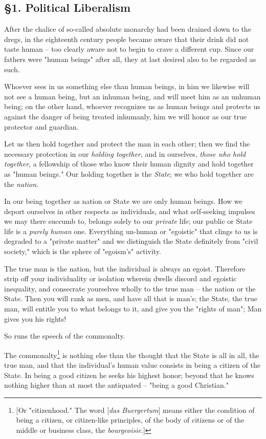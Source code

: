 \subsection[\S{}1. Political Liberalism]{\centering \S{}1. Political Liberalism}

After the chalice of so-called absolute monarchy had been drained down to the 
dregs, in the eighteenth century people became aware that their drink did not 
taste human -- too clearly aware not to begin to crave a different cup. Since 
our fathers were "{}human beings"{} after all, they at last desired also to be 
regarded as such.

Whoever sees in us something else than human beings, in him we likewise will 
not see a human being, but an inhuman being, and will meet him as an unhuman 
being; on the other hand, whoever recognizes us as human beings and protects 
us against the danger of being treated inhumanly, him we will honor as our 
true protector and guardian.

Let us then hold together and protect the man in each other; then we find the 
necessary protection in our \textit{holding together}, and in ourselves, 
\textit{those who hold together}, a fellowship of those who know their human 
dignity and hold together as "{}human beings."{} Our holding together is the 
\textit{State}; we who hold together are the \textit{nation}.

In our being together as nation or State we are only human beings. How we 
deport ourselves in other respects as individuals, and what self-seeking 
impulses we may there succumb to, belongs solely to our \textit{private} life; 
our public or State life is a \textit{purely human} one. Everything un-human 
or "{}egoistic"{} that clings to us is degraded to a "{}private matter"{} and 
we distinguish the State definitely from "{}civil society,"{} which is the 
sphere of "{}egoism's"{} activity.

The true man is the nation, but the individual is always an egoist. Therefore 
strip off your individuality or isolation wherein dwells discord and egoistic 
inequality, and consecrate yourselves wholly to the true man -- the nation or 
the State. Then you will rank as men, and have all that is man's; the State, 
the true man, will entitle you to what belongs to it, and give you the 
"{}rights of man"{}; Man gives you his rights!

So runs the speech of the commonalty.

The commonalty\footnote{[Or "{}citizenhood."{} The word [\textit{das 
Buergertum}] means either the condition of being a citizen, or citizen-like 
principles, of the body of citizens or of the middle or business class, the 
\textit{bourgeoisie}.]} is nothing else than the thought that the State is all 
in all, the true man, and that the individual's human value consists in being 
a citizen of the State. In being a good citizen he seeks his highest honor; 
beyond that he knows nothing higher than at most the antiquated -- "{}being a 
good Christian."{}

